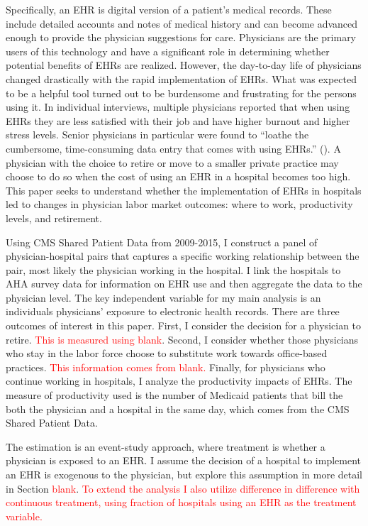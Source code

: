 \documentclass[11pt]{article}
\begin{document}
Specifically, an EHR is digital version of a patient’s medical records. These include detailed accounts and notes of medical history and can become advanced enough to provide the physician suggestions for care. Physicians are the primary users of this technology and have a significant role in determining whether potential benefits of EHRs are realized. However, the day-to-day life of physicians changed drastically with the rapid implementation of EHRs. What was expected to be a helpful tool turned out to be burdensome and frustrating for the persons using it. In individual interviews, multiple physicians reported that when using EHRs they are less satisfied with their job and have higher burnout and higher stress levels. Senior physicians in particular were found to “loathe the cumbersome, time-consuming data entry that comes with using EHRs.” (\cite{CollierBurnout}). A physician with the choice to retire or move to a smaller private practice may choose to do so when the cost of using an EHR in a hospital becomes too high. This paper seeks to understand whether the implementation of EHRs in hospitals led to changes in physician labor market outcomes: where to work, productivity levels, and retirement.

Using CMS Shared Patient Data from 2009-2015, I construct a panel of physician-hospital pairs that captures a specific working relationship between the pair, most likely the physician working in the hospital. I link the hospitals to AHA survey data for information on EHR use and then aggregate the data to the physician level. The key independent variable for my main analysis is an individuals physicians' exposure to electronic health records. There are three outcomes of interest in this paper. First, I consider the decision for a physician to retire. \textcolor{red}{This is measured using blank}. Second, I consider whether those physicians who stay in the labor force choose to substitute work towards office-based practices. \textcolor{red}{This information comes from blank.} Finally, for physicians who continue working in hospitals, I analyze the productivity impacts of EHRs. The measure of productivity used is the number of Medicaid patients that bill the both the physician and a hospital in the same day, which comes from the CMS Shared Patient Data. 

The estimation is an event-study approach, where treatment is whether a physician is exposed to an EHR. I assume the decision of a hospital to implement an EHR is exogenous to the physician, but explore this assumption in more detail in Section \textcolor{red}{blank}. \textcolor{red}{To extend the analysis I also utilize difference in difference with continuous treatment, using fraction of hospitals using an EHR as the treatment variable.}  
\end{document}
